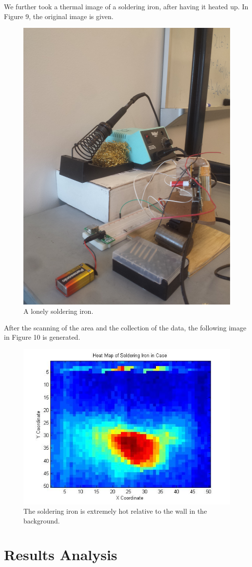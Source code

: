 \documentclass[11pt]{article}
\begin{document}
We further took a thermal image of a soldering iron, after having it heated up. In Figure 9, the original image is given.
\begin{figure}[H]
    \centering
    \includegraphics[width=.6\textwidth, angle = 270]{iron}
    \caption{A lonely soldering iron.}
\end{figure}
\newpage

After the scanning of the area and the collection of the data, the following image in Figure 10 is generated.

\begin{figure}[H]
    \centering
    \includegraphics[width=.6\textwidth]{heatmap2}
    \caption{The soldering iron is extremely hot relative to the wall in the background.}
\end{figure}

\section{Results Analysis}
\end{document}
